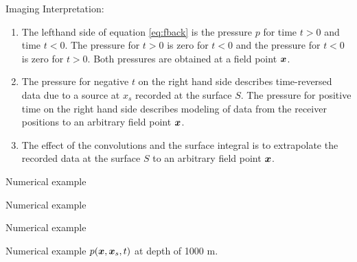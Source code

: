 \documentclass[xcolor=dvipsnames,notes]{beamer}
\begin{document}
\begin{frame}{Imaging}
Interpretation:
\begin{enumerate}
\item The lefthand side of equation \eqref{eq:fback} is the pressure
$p$ for time $t >0$ and time $t <0$. 
The pressure for $t >0$ is zero for $t<0$ and the pressure for $t<0$ is zero for
$t>0$. Both pressures are obtained at a field point $\mbox{\boldmath $x$}$. 
\item The pressure for negative $t$ on the right hand side describes time-reversed data due to
      a source at $x_s$ recorded
      at the surface $S$. The pressure for positive time on the right hand side describes
      modeling of data from the receiver positions to an arbitrary field point $\mbox{\boldmath $x$}$.
\item The effect of the convolutions and the surface integral is to extrapolate
      the recorded data at the surface $S$ to an arbitrary field point $\mbox{\boldmath $x$}$.
\end{enumerate}
\end{frame}
\begin{frame}{Numerical example}
%
\begin{figure}
\end{figure}
\end{frame}
\begin{frame}{Numerical example}
%
\begin{figure}
\end{figure}
\end{frame}
\begin{frame}{Numerical example}
%
\begin{figure}
\end{figure}
\end{frame}
\begin{frame}{Numerical example}
$p(\mbox{\boldmath $x$},\mbox{\boldmath $x$}_s,t)$ at depth of 1000 m.
%
\begin{figure}
\end{figure}
\end{frame}
\end{document}
